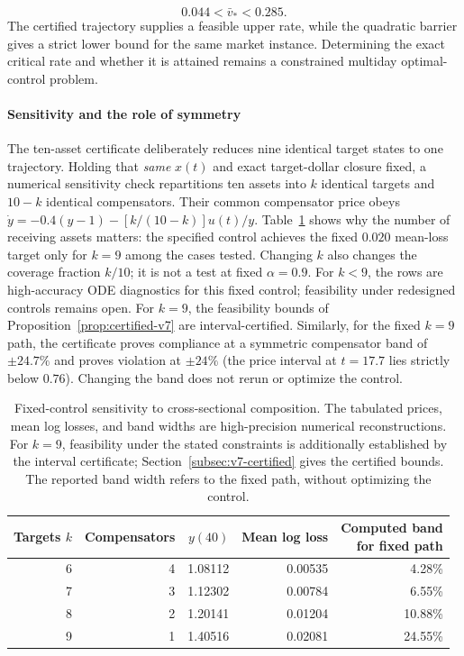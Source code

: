 \documentclass[review,hidelinks,onefignum,onetabnum]{siamonline250211}
\begin{document}
\begin{equation}\label{eq:v7-rate-bracket}
\boxed{\qquad 0.044<\bar v_*<0.285.\qquad}
\end{equation}
The certified trajectory supplies a feasible upper rate, while the quadratic barrier gives a strict lower bound for the same market instance. Determining the exact critical rate and whether it is attained remains a constrained multiday optimal-control problem.
\paragraph{Sensitivity and the role of symmetry}
The ten-asset certificate deliberately reduces nine identical target states to one trajectory. Holding that \emph{same} $x(t)$ and exact target-dollar closure fixed, a numerical sensitivity check repartitions ten assets into $k$ identical targets and $10-k$ identical compensators. Their common compensator price obeys $\dot y=-0.4(y-1)-[k/(10-k)]u(t)/y$. Table~\ref{tab:sensitivity} shows why the number of receiving assets matters: the specified control achieves the fixed $0.020$ mean-loss target only for $k=9$ among the cases tested. Changing $k$ also changes the coverage fraction $k/10$; it is not a test at fixed $\alpha=0.9$. For $k<9$, the rows are high-accuracy ODE diagnostics for this fixed control; feasibility under redesigned controls remains open. For $k=9$, the feasibility bounds of Proposition~\ref{prop:certified-v7} are interval-certified. Similarly, for the fixed $k=9$ path, the certificate proves compliance at a symmetric compensator band of $\pm24.7\%$ and proves violation at $\pm24\%$ (the price interval at $t=17.7$ lies strictly below $0.76$). Changing the band does not rerun or optimize the control.
\begin{table}[H]\centering\small
\caption{Fixed-control sensitivity to cross-sectional composition. The tabulated prices, mean log losses, and band widths are high-precision numerical reconstructions. For $k=9$, feasibility under the stated constraints is additionally established by the interval certificate; Section~\ref{subsec:v7-certified} gives the certified bounds. The reported band width refers to the fixed path, without optimizing the control.}\label{tab:sensitivity}
\begin{tabular}{@{}rrrrr@{}}\toprule
Targets $k$ & Compensators & $y(40)$ & Mean log loss & \shortstack{Computed band\\for fixed path} \\\midrule
6 & 4 & 1.08112 & 0.00535 & 4.28\%\\
7 & 3 & 1.12302 & 0.00784 & 6.55\%\\
8 & 2 & 1.20141 & 0.01204 & 10.88\%\\
9 & 1 & 1.40516 & 0.02081 & 24.55\%\\
\bottomrule\end{tabular}
\end{table}
\end{document}

